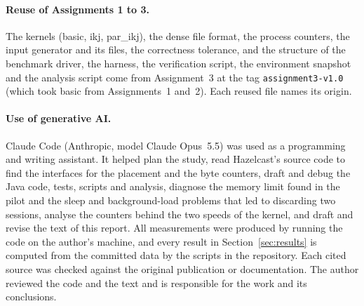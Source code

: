 \documentclass[11pt,a4paper]{article}
\begin{document}
\paragraph{Reuse of Assignments 1 to 3.} The kernels (basic, ikj, par\_ikj),
the dense file format, the process counters, the input generator and its files,
the correctness tolerance, and the structure of the benchmark driver, the
harness, the verification script, the environment snapshot and the analysis
script come from Assignment~3 at the tag \texttt{assignment3-v1.0} (which took
basic from Assignments~1 and~2). Each reused file names its origin.

\paragraph{Use of generative AI.} Claude Code (Anthropic, model Claude Opus~5.5)
was used as a programming and writing assistant. It helped plan the study,
read Hazelcast's source code to find the interfaces for the placement and the
byte counters, draft and debug the Java code, tests, scripts and analysis,
diagnose the memory limit found in the pilot and the sleep and background-load
problems that led to discarding two sessions, analyse the counters behind the
two speeds of the kernel, and draft and revise the text of this report. All measurements were produced by running the code on the author's
machine, and every result in Section~\ref{sec:results} is computed from the
committed data by the scripts in the repository. Each cited source was checked
against the original publication or documentation. The author reviewed the
code and the text and is responsible for the work and its conclusions.
\end{document}
